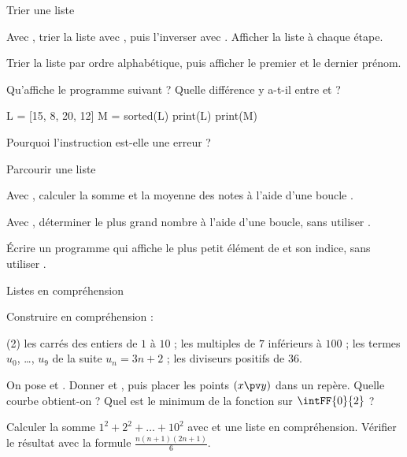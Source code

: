 
\begin{exercice}[2]{Trier une liste}
\begin{questions}
  \item Avec , trier la liste avec , puis l'inverser avec . Afficher la liste à
    chaque étape.
  \item Trier la liste  par ordre alphabétique, puis afficher le premier et le dernier
    prénom.
  \item Qu'affiche le programme suivant ? Quelle différence y a-t-il entre  et  ?
\begin{python}
L = [15, 8, 20, 12]
M = sorted(L)
print(L)
print(M)
\end{python}
  \item Pourquoi l'instruction  est-elle une erreur ?
\end{questions}
\end{exercice}

\begin{exercice}[2]{Parcourir une liste}
\begin{questions}
  \item Avec , calculer la somme et la moyenne des notes à l'aide d'une boucle .
  \item Avec , déterminer le plus grand nombre à l'aide d'une boucle, sans utiliser .
  \item Écrire un programme qui affiche le plus petit élément de  et son indice, sans utiliser .
\end{questions}
\end{exercice}

\begin{exercice}[2]{Listes en compréhension}
\begin{questions}
  \item Construire en compréhension :
\begin{tasks}[label=\alph*)](2)
  \task les carrés des entiers de $1$ à $10$ ;
  \task les multiples de $7$ inférieurs à $100$ ;
  \task les termes $u_0$, …, $u_9$ de la suite $u_n=3n+2$ ;
  \task les diviseurs positifs de $36$.
\end{tasks}
  \item On pose  et . Donner  et , puis
    placer les points $(x\pv y)$ dans un repère. Quelle courbe obtient-on ? Quel est le minimum de la fonction sur $\intFF{0}{2}$ ?
  \item Calculer la somme $1^{2}+2^{2}+\dots+10^{2}$ avec  et une liste en compréhension. Vérifier le résultat avec la
    formule $\frac{n(n+1)(2n+1)}{6}$.
\end{questions}
\end{exercice}

